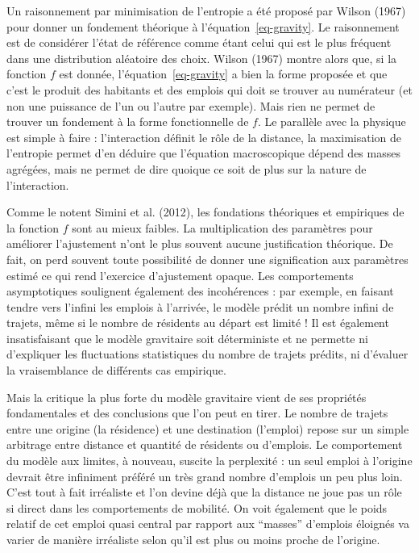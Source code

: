 \documentclass[
  10pt,
  a4paper,
  numbers=noendperiod,
  DIV=9]{scrreprt}
\begin{document}
Un raisonnement par minimisation de l'entropie a été proposé par Wilson
(1967) pour donner un fondement théorique à l'équation~\ref{eq-gravity}.
Le raisonnement est de considérer l'état de référence comme étant celui
qui est le plus fréquent dans une distribution aléatoire des choix.
Wilson (1967) montre alors que, si la fonction \(f\) est donnée,
l'équation~\ref{eq-gravity} a bien la forme proposée et que c'est le
produit des habitants et des emplois qui doit se trouver au numérateur
(et non une puissance de l'un ou l'autre par exemple). Mais rien ne
permet de trouver un fondement à la forme fonctionnelle de \(f\). Le
parallèle avec la physique est simple à faire : l'interaction définit le
rôle de la distance, la maximisation de l'entropie permet d'en déduire
que l'équation macroscopique dépend des masses agrégées, mais ne permet
de dire quoique ce soit de plus sur la nature de l'interaction.

Comme le notent Simini et al. (2012), les fondations théoriques et
empiriques de la fonction \(f\) sont au mieux faibles. La multiplication
des paramètres pour améliorer l'ajustement n'ont le plus souvent aucune
justification théorique. De fait, on perd souvent toute possibilité de
donner une signification aux paramètres estimé ce qui rend l'exercice
d'ajustement opaque. Les comportements asymptotiques soulignent
également des incohérences : par exemple, en faisant tendre vers
l'infini les emplois à l'arrivée, le modèle prédit un nombre infini de
trajets, même si le nombre de résidents au départ est limité ! Il est
également insatisfaisant que le modèle gravitaire soit déterministe et
ne permette ni d'expliquer les fluctuations statistiques du nombre de
trajets prédits, ni d'évaluer la vraisemblance de différents cas
empirique.

Mais la critique la plus forte du modèle gravitaire vient de ses
propriétés fondamentales et des conclusions que l'on peut en tirer. Le
nombre de trajets entre une origine (la résidence) et une destination
(l'emploi) repose sur un simple arbitrage entre distance et quantité de
résidents ou d'emplois. Le comportement du modèle aux limites, à
nouveau, suscite la perplexité : un seul emploi à l'origine devrait être
infiniment préféré un très grand nombre d'emplois un peu plus loin.
C'est tout à fait irréaliste et l'on devine déjà que la distance ne joue
pas un rôle si direct dans les comportements de mobilité. On voit
également que le poids relatif de cet emploi quasi central par rapport
aux ``masses'' d'emplois éloignés va varier de manière irréaliste selon
qu'il est plus ou moins proche de l'origine.
\end{document}
